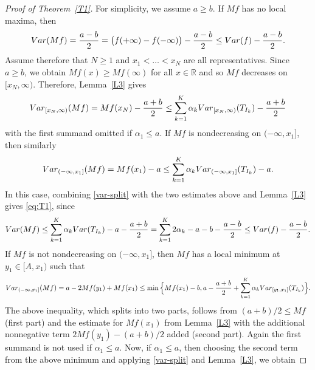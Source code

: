 \documentclass[leqno,11pt]{amsart}
\numberwithin{equation}{section}
\numberwithin{theorem}{section}
\newcommand{\RR}{\mathbb{R}}
\newcommand{\Var}{{\rm Var}}
\begin{document}
	\begin{proof}[Proof of Theorem~\ref{T1}]
		For simplicity, we assume $a \geq b$. If $Mf$ has no local maxima, then 
		\[
		\Var(Mf) = \frac{a-b}{2} =\big(f(+\infty) - f(-\infty)\big) - \frac{a-b}{2} \leq \Var(f) - \frac{a-b}{2}.
		\]
		Assume therefore that $N\ge1$ and $x_1 < \dots < x_N$ are all representatives. Since $a \geq b$, we obtain $Mf(x) \geq Mf(\infty)$ for all $x \in \RR$ and so $Mf$ decreases on $[x_N,\infty)$. Therefore, Lemma~\ref{L3} gives 
		\[
		\Var_{[x_N,\infty)}(Mf) = Mf(x_N) - \frac{a+b}{2}
		\leq \sum_{k=1}^K \alpha_k \Var_{[x_N, \infty)} (T_{I_k}) - \frac{a+b}{2}
		\]
		with the first summand omitted if $\alpha_1 \leq a$.
		If $Mf$ is nondecreasing on $(- \infty, x_1]$, then similarly
		\[
		\Var_{(-\infty, x_1]}(Mf) = Mf(x_1) - a 
		\leq \sum_{k=1}^K \alpha_k \Var_{(-\infty, x_1]} (T_{I_k}) - a.
		\]
		In this case, combining \eqref{var-split} with the two estimates above and Lemma~\ref{L3} gives \eqref{eq:T1}, since
		\[
		\Var(Mf) \leq \sum_{k=1}^K \alpha_k \Var(T_{I_k}) - a - \frac{a+b}{2} = \sum_{k=1}^K 2 \alpha_k - a - b - \frac{a-b}{2}
		\leq \Var(f) - \frac{a-b}{2}.
		\]
		If 
		$Mf$ is not nondecreasing on $(- \infty, x_1]$, then 
		$Mf$ has a local minimum at $y_1 \in [A, x_1)$ such that 
		\[
		\Var_{(-\infty, x_1]}(Mf) = a - 2 Mf(y_1) + Mf(x_1)
		\leq \min \Big \{ Mf(x_1) - b, a - \frac{a+b}{2} + \sum_{k=1}^K \alpha_k \Var_{[y_1, x_1]} (T_{I_k}) \Big \}. 
		\]
		The above inequality, which splits into two parts, follows from $(a+b)/2\le Mf$ (first part) and the estimate for $Mf(x_1)$ from Lemma~\ref{L3} with the additional nonnegative term  $2Mf(y_1)-(a+b)/2$ added (second part). Again the first summand is not used if $\alpha_1 \leq a$.
		Now, if $\alpha_1 \leq a$, then choosing the second term from the above minimum and applying \eqref{var-split} and Lemma~\ref{L3}, we obtain

\end{proof}
\end{document}
